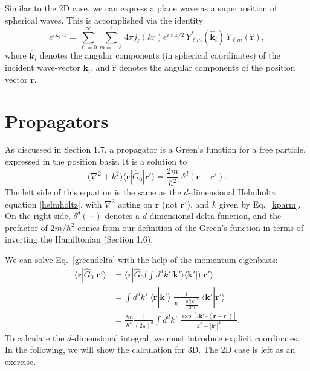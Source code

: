 \documentclass[pra,12pt]{revtex4}
\begin{document}
Similar to the 2D case, we can express a plane wave as a superposition
of spherical waves.  This is accomplished via the identity
\begin{equation}
  e^{i\mathbf{k}_i \cdot \mathbf{r}}
  = \sum_{\ell=0}^\infty \sum_{m=-\ell}^\ell 4 \pi j_{\ell}(kr) e^{i\ell\pi/2} \,
  Y_{\ell m}^*(\hat{\mathbf{k}}_i) \, Y_{\ell m}(\hat{\mathbf{r}}),
  \label{plane_wave_decomp}
\end{equation}
where $\hat{\mathbf{k}}_i$ denotes the angular components (in
spherical coordinates) of the incident wave-vector $\mathbf{k}_i$, and
$\hat{\mathbf{r}}$ denotes the angular components of the position
vector $\mathbf{r}$.

\section{Propagators}
\label{sec:propagator}

As discussed in Section 1.7, a propagator is a Green's function for a
free particle, expressed in the position basis.  It is a solution to
\begin{equation}
  \Big(\nabla^2 + k^2\Big) \langle\mathbf{r} |\hat{G}_0 |\mathbf{r}'\rangle
  = \frac{2m}{\hbar^2} \; \delta^d(\mathbf{r}-\mathbf{r}').
  \label{greendelta}
\end{equation}
The left side of this equation is the same as the $d$-dimensional
Helmholtz equation \eqref{helmholtz}, with $\nabla^2$ acting on
$\mathbf{r}$ (not $\mathbf{r}'$), and $k$ given by Eq.~\eqref{kparm}.
On the right side, $\delta^d(\cdots)$ denotes a $d$-dimensional delta
function, and the prefactor of $2m/\hbar^2$ comes from our definition
of the Green's function in terms of inverting the Hamiltonian (Section
1.6).

We can solve Eq.~\eqref{greendelta} with the help of the momentum
eigenbasis:
\begin{align}
  \langle\mathbf{r}|\hat{G}_0|\mathbf{r}'\rangle
  &= \langle\mathbf{r}|\hat{G}_0 \Big(\int d^dk' |\mathbf{k}'\rangle\langle\mathbf{k}'| \Big) |\mathbf{r}'\rangle \nonumber \\
  &= \int d^dk' \; \langle\mathbf{r}|\mathbf{k}'\rangle \;
  \frac{1}{E-\frac{\hbar^2|\mathbf{k}'|^2}{2m}} \;
  \langle\mathbf{k}'|\mathbf{r}'\rangle \nonumber \\
  &= \frac{2m}{\hbar^2} \frac{1}{(2\pi)^d} \int d^dk' \;
  \frac{\exp\left[i\mathbf{k}' \cdot
      (\mathbf{r}-\mathbf{r}')\right]}{k^2-|\mathbf{k}'|^2}.
  \label{rGr}
\end{align}
To calculate the $d$-dimensional integral, we must introduce explicit
coordinates.  In the following, we will show the calculation for 3D.
The 2D case is left as an \hyperref[ex:2dpropagator]{exercise}.
\end{document}
